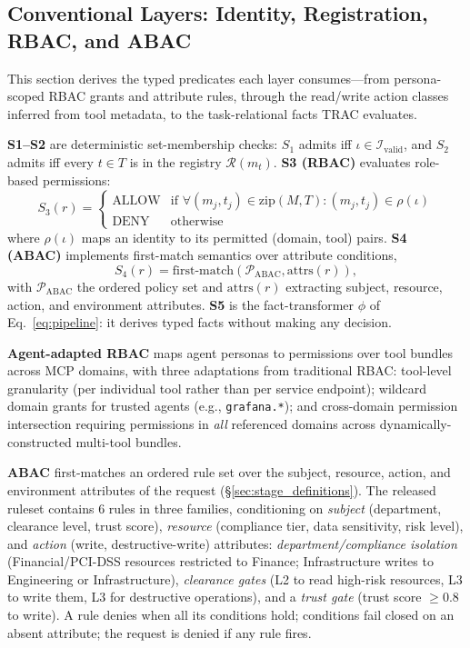 \documentclass[sigconf,review,anonymous]{acmart}
\begin{document}
\subsection{Conventional Layers: Identity, Registration, RBAC, and ABAC}
\label{sec:layers}
\label{sec:stage_definitions}
\label{sec:rbac_abac_classification}
\label{sec:identity}


This section derives the typed predicates each layer consumes---from persona-scoped RBAC grants and attribute rules, through the read/write action classes inferred from tool metadata, to the task-relational facts TRAC evaluates.

\textbf{S1--S2} are deterministic set-membership checks: $S_1$ admits iff $\iota \in \mathcal{I}_{\text{valid}}$, and $S_2$ admits iff every $t\in T$ is in the registry $\mathcal{R}(m_t)$. \textbf{S3 (RBAC)} evaluates role-based permissions:
\begin{equation}
S_3(r) = \begin{cases}
\text{ALLOW} & \text{if } \forall (m_j, t_j) \in \text{zip}(M,T)\!: (m_j, t_j) \in \rho(\iota) \\
\text{DENY} & \text{otherwise}
\end{cases}
\label{eq:rbac}
\end{equation}
where $\rho(\iota)$ maps an identity to its permitted (domain, tool) pairs. \textbf{S4 (ABAC)} implements first-match semantics over attribute conditions,
\begin{equation}
S_4(r) = \text{first-match}(\mathcal{P}_{\text{ABAC}}, \text{attrs}(r)),
\label{eq:abac}
\end{equation}
with $\mathcal{P}_{\text{ABAC}}$ the ordered policy set and $\text{attrs}(r)$ extracting subject, resource, action, and environment attributes. \textbf{S5} is the fact-transformer $\phi$ of Eq.~\ref{eq:pipeline}: it derives typed facts without making any decision. 

\textbf{Agent-adapted RBAC} maps agent personas to permissions over tool bundles across MCP domains, with three adaptations from traditional RBAC: tool-level granularity (per individual tool rather than per service endpoint); wildcard domain grants for trusted agents (e.g., \texttt{grafana.*}); and cross-domain permission intersection requiring permissions in \emph{all} referenced domains across dynamically-constructed multi-tool bundles.

\textbf{ABAC} first-matches an ordered rule set over the subject, resource, action, and environment attributes of the request (\S\ref{sec:stage_definitions}). The released ruleset contains $6$ rules in three families, conditioning on \emph{subject} (department, clearance level, trust score), \emph{resource} (compliance tier, data sensitivity, risk level), and \emph{action} (write, destructive-write) attributes: \emph{department/compliance isolation} (Financial/PCI-DSS resources restricted to Finance; Infrastructure writes to Engineering or Infrastructure), \emph{clearance gates} (L2 to read high-risk resources, L3 to write them, L3 for destructive operations), and a \emph{trust gate} (trust score $\geq 0.8$ to write). A rule denies when all its conditions hold; conditions fail closed on an absent attribute; the request is denied if any rule fires.
\end{document}
